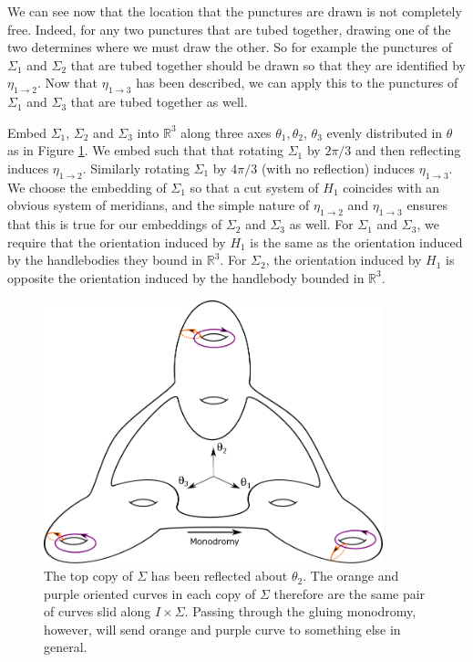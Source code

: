 \documentclass[12pt]{amsart}
\newcommand{\R}{\mathbb{R}}
\theoremstyle{definition}
\theoremstyle{remark}
\begin{document}
We can see now that the location that the punctures are drawn is not completely free.  Indeed, for any two punctures that are tubed together, drawing one of the two determines where we must draw the other.  So for example the punctures of $\Sigma_1$ and $\Sigma_2$ that are tubed together should be drawn so that they are identified by $\eta_{1 \to 2}$.  Now that $\eta_{1 \to 3}$ has been described, we can apply this to the punctures of $\Sigma_1$ and $\Sigma_3$ that are tubed together as well.

Embed $\Sigma_1$, $\Sigma_2$ and $\Sigma_3$ into $\R^3$ along three axes $\theta_1,\theta_2$, $\theta_3$ evenly distributed in $\theta$ as in Figure \ref{embeddingsigmas}.
We embed such that that rotating $\Sigma_1$ by $2\pi/3$ and then reflecting induces $\eta_{1 \to 2}$.
Similarly rotating $\Sigma_1$ by $4\pi/3$ (with no reflection) induces $\eta_{1 \to 3}$.
We choose the embedding of $\Sigma_1$ so that a cut system of $H_1$ coincides with an obvious system of meridians, and the simple nature of $\eta_{1 \to 2}$ and $\eta_{1 \to 3}$ ensures that this is true for our embeddings of $\Sigma_2$ and $\Sigma_3$ as well.
For $\Sigma_1$ and $\Sigma_3$, we require that the orientation induced by $H_1$ is the same as the orientation induced by the handlebodies they bound in $\R^3$.
For $\Sigma_2$, the orientation induced by $H_1$ is opposite the orientation induced by the handlebody bounded in $\R^3$.

\begin{figure}[h]
\centering
\includegraphics[height=3in]{sigmas.png}
\caption{  The top copy of $\Sigma$ has been reflected about $\theta_2$.
The orange and purple oriented curves in each copy of $\Sigma$ therefore are the same pair of curves slid along $I \times \Sigma$.
Passing through the gluing monodromy, however, will send orange and purple curve to something else in general.}
\label{embeddingsigmas}
\end{figure}
\end{document}
